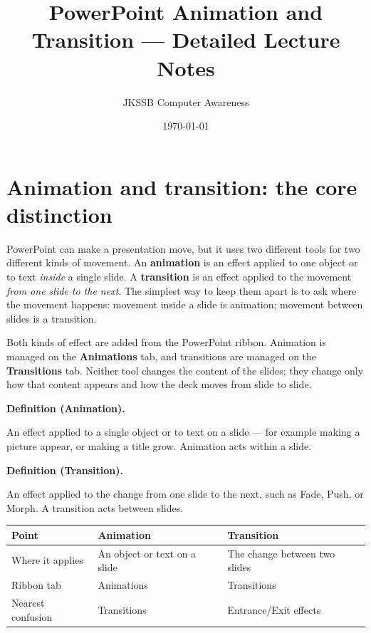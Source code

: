 \documentclass[11pt]{article}
\title{PowerPoint Animation and Transition --- Detailed Lecture Notes}
\author{JKSSB Computer Awareness}
\date{\today}
\newenvironment{definitionbox}[1]{%
  \par\noindent\textbf{Definition (#1).}\ \itshape
}{\par\vspace{0.3em}}
\begin{document}
\maketitle

\section{Animation and transition: the core distinction}
PowerPoint can make a presentation move, but it uses two different tools for
two different kinds of movement. An \textbf{animation} is an effect applied to
one object or to text \emph{inside} a single slide. A \textbf{transition} is an
effect applied to the movement \emph{from one slide to the next}. The simplest
way to keep them apart is to ask where the movement happens: movement inside a
slide is animation; movement between slides is a transition.

Both kinds of effect are added from the PowerPoint ribbon. Animation is
managed on the \textbf{Animations} tab, and transitions are managed on the
\textbf{Transitions} tab. Neither tool changes the content of the slides; they
change only how that content appears and how the deck moves from slide to
slide.

\begin{definitionbox}{Animation}
An effect applied to a single object or to text on a slide --- for example
making a picture appear, or making a title grow. Animation acts within a
slide.
\end{definitionbox}

\begin{definitionbox}{Transition}
An effect applied to the change from one slide to the next, such as Fade,
Push, or Morph. A transition acts between slides.
\end{definitionbox}

\begin{center}
\begin{tabular}{p{}p{}p{}}
\toprule
\textbf{Point} & \textbf{Animation} & \textbf{Transition} \\
\midrule
Where it applies & An object or text on a slide & The change between two slides \\
Ribbon tab & Animations & Transitions \\
Nearest confusion & Transitions & Entrance/Exit effects \\
\bottomrule
\end{tabular}
\end{center}
\end{document}
